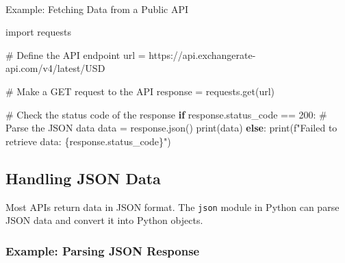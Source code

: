 \documentclass[
  letterpaper,
  DIV=11,
  numbers=noendperiod]{scrreprt}
\makeatletter
\let\oldparagraph\paragraph
\renewcommand{\paragraph}{
    \@ifstar
      \xxxParagraphStar
      \xxxParagraphNoStar
  }
\newcommand{\xxxParagraphStar}[1]{\oldparagraph*{#1}\mbox{}}
\newcommand{\xxxParagraphNoStar}[1]{\oldparagraph{#1}\mbox{}}
\newenvironment{Shaded}{\begin{snugshade}}{\end{snugshade}}
\newcommand{\BuiltInTok}[1]{\textcolor[rgb]{0.00,0.23,0.31}{#1}}
\newcommand{\CommentTok}[1]{\textcolor[rgb]{0.37,0.37,0.37}{#1}}
\newcommand{\ControlFlowTok}[1]{\textcolor[rgb]{0.00,0.23,0.31}{\textbf{#1}}}
\newcommand{\DecValTok}[1]{\textcolor[rgb]{0.68,0.00,0.00}{#1}}
\newcommand{\ImportTok}[1]{\textcolor[rgb]{0.00,0.46,0.62}{#1}}
\newcommand{\NormalTok}[1]{\textcolor[rgb]{0.00,0.23,0.31}{#1}}
\newcommand{\OperatorTok}[1]{\textcolor[rgb]{0.37,0.37,0.37}{#1}}
\newcommand{\SpecialCharTok}[1]{\textcolor[rgb]{0.37,0.37,0.37}{#1}}
\newcommand{\SpecialStringTok}[1]{\textcolor[rgb]{0.13,0.47,0.30}{#1}}
\newcommand{\StringTok}[1]{\textcolor[rgb]{0.13,0.47,0.30}{#1}}
\makeatother
\begin{document}
\paragraph{Example: Fetching Data from a Public
API}\label{example-fetching-data-from-a-public-api}

\begin{Shaded}
\begin{Highlighting}[]
\ImportTok{import}\NormalTok{ requests}

\CommentTok{\# Define the API endpoint}
\NormalTok{url }\OperatorTok{=} \StringTok{\textquotesingle{}https://api.exchangerate{-}api.com/v4/latest/USD\textquotesingle{}}

\CommentTok{\# Make a GET request to the API}
\NormalTok{response }\OperatorTok{=}\NormalTok{ requests.get(url)}

\CommentTok{\# Check the status code of the response}
\ControlFlowTok{if}\NormalTok{ response.status\_code }\OperatorTok{==} \DecValTok{200}\NormalTok{:}
    \CommentTok{\# Parse the JSON data}
\NormalTok{    data }\OperatorTok{=}\NormalTok{ response.json()}
    \BuiltInTok{print}\NormalTok{(data)}
\ControlFlowTok{else}\NormalTok{:}
    \BuiltInTok{print}\NormalTok{(}\SpecialStringTok{f"Failed to retrieve data: }\SpecialCharTok{\{}\NormalTok{response}\SpecialCharTok{.}\NormalTok{status\_code}\SpecialCharTok{\}}\SpecialStringTok{"}\NormalTok{)}
\end{Highlighting}
\end{Shaded}

\subsection{Handling JSON Data}\label{handling-json-data-1}

Most APIs return data in JSON format. The \texttt{json} module in Python
can parse JSON data and convert it into Python objects.

\subsubsection{Example: Parsing JSON
Response}\label{example-parsing-json-response}
\end{document}
